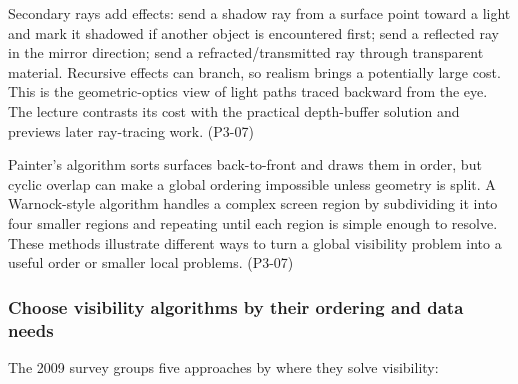 Secondary rays add effects: send a shadow ray from a surface point toward a light and mark it shadowed if another object is encountered first; send a reflected ray in the mirror direction; send a refracted/transmitted ray through transparent material. Recursive effects can branch, so realism brings a potentially large cost. This is the geometric-optics view of light paths traced backward from the eye. The lecture contrasts its cost with the practical depth-buffer solution and previews later ray-tracing work. (P3-07)

Painter's algorithm sorts surfaces back-to-front and draws them in order, but cyclic overlap can make a global ordering impossible unless geometry is split. A Warnock-style algorithm handles a complex screen region by subdividing it into four smaller regions and repeating until each region is simple enough to resolve. These methods illustrate different ways to turn a global visibility problem into a useful order or smaller local problems. (P3-07)

\subsubsection{Choose visibility algorithms by their ordering and data needs}\label{04-visual-computing-ii-ch029-choose-visibility-algorithms-by-their-ordering-and-data-needs}

The 2009 survey groups five approaches by where they solve visibility:

